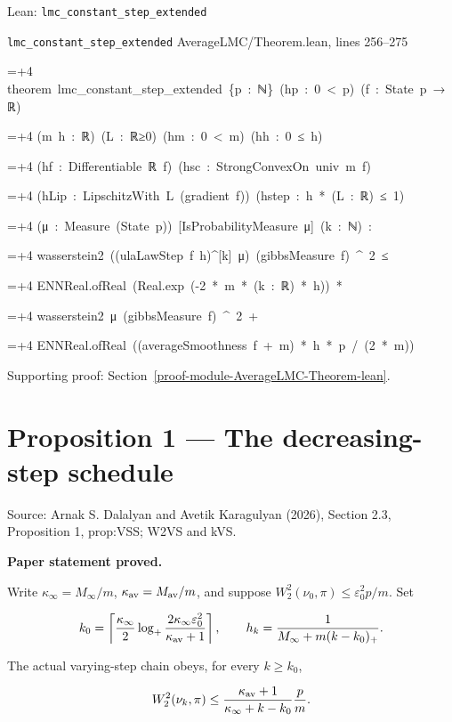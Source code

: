 \documentclass[11pt,a4paper]{report}
\newlength{\leancharwidth}
\newenvironment{leancode}{\par\smallskip\begingroup\ttfamily\footnotesize\raggedright
  \settowidth{\leancharwidth}{M}\setlength{\parskip}{0pt}\setlength{\parindent}{0pt}
  \frenchspacing}{\par\endgroup\smallskip}
\newcommand{\leanline}[2]{\hangindent=\dimexpr#1\leancharwidth+4\leancharwidth\relax
  \hangafter=1\noindent\hspace*{#1\leancharwidth}#2\par}
\newcommand{\leansource}[1]{\par{\footnotesize\color{leanmuted}#1}\par}
\begin{document}
\begin{leanbox}{Lean: \texttt{lmc\_\allowbreak{}constant\_\allowbreak{}step\_\allowbreak{}extended}}
\leansource{\texttt{lmc\_\allowbreak{}constant\_\allowbreak{}step\_\allowbreak{}extended} \quad AverageLMC/\allowbreak{}Theorem.lean, lines 256–275}
\begin{leancode}
\leanline{0}{theorem\ lmc\_constant\_step\_extended\ \{p\ :\ ℕ\}\ (hp\ :\ 0\ <\ p)\ (f\ :\ State\ p\ →\ ℝ)}
\leanline{4}{(m\ h\ :\ ℝ)\ (L\ :\ ℝ≥0)\ (hm\ :\ 0\ <\ m)\ (hh\ :\ 0\ ≤\ h)}
\leanline{4}{(hf\ :\ Differentiable\ ℝ\ f)\ (hsc\ :\ StrongConvexOn\ univ\ m\ f)}
\leanline{4}{(hLip\ :\ LipschitzWith\ L\ (gradient\ f))\ (hstep\ :\ h\ *\ (L\ :\ ℝ)\ ≤\ 1)}
\leanline{4}{(μ\ :\ Measure\ (State\ p))\ [IsProbabilityMeasure\ μ]\ (k\ :\ ℕ)\ :}
\leanline{4}{wasserstein2\ ((ulaLawStep\ f\ h)\textasciicircum{}[k]\ μ)\ (gibbsMeasure\ f)\ \textasciicircum{}\ 2\ ≤}
\leanline{6}{ENNReal.ofReal\ (Real.exp\ (-2\ *\ m\ *\ (k\ :\ ℝ)\ *\ h))\ *}
\leanline{8}{wasserstein2\ μ\ (gibbsMeasure\ f)\ \textasciicircum{}\ 2\ +}
\leanline{6}{ENNReal.ofReal\ ((averageSmoothness\ f\ +\ m)\ *\ h\ *\ p\ /\ (2\ *\ m))}
\end{leancode}
\end{leanbox}

{\small\color{gray}Supporting proof: Section~\ref{proof-module-AverageLMC-Theorem-lean}.\par}
\section{\texorpdfstring{Proposition 1 — The decreasing-step schedule}{Proposition 1 — The decreasing-step schedule}}


Source: Arnak S. Dalalyan and Avetik Karagulyan (2026), Section 2.3, Proposition 1, prop:VSS; W2VS and kVS.



\textbf{Paper statement proved.}



Write \(\kappa_\infty=M_\infty/m\),
\(\kappa_{\rm av}=M_{\rm av}/m\), and suppose
\(W_2^2(\nu_0,\pi)\le\varepsilon_0^2p/m\). Set


\[k_0=\left\lceil\frac{\kappa_\infty}{2}
\log_+\frac{2\kappa_\infty\varepsilon_0^2}{\kappa_{\rm av}+1}\right\rceil,
\qquad h_k=\frac1{M_\infty+m(k-k_0)_+}.\]


The actual varying-step chain obeys, for every \(k\ge k_0\),


\[W_2^2(\nu_k,\pi)\le
\frac{\kappa_{\rm av}+1}{\kappa_\infty+k-k_0}\frac p m.\]
\end{document}
